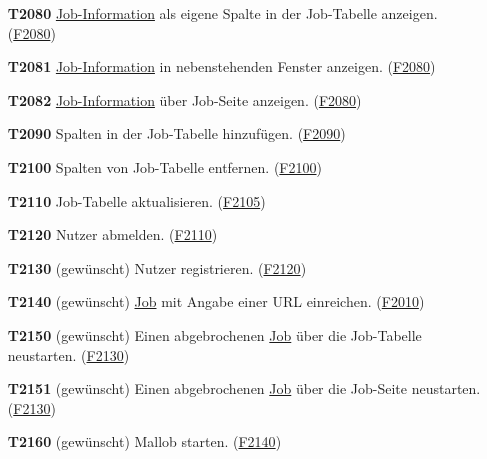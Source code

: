 \begin{itemize}
    \item[\textbf{T2080}] \hyperref[B:Job-Informationen]{Job-Information} als eigene Spalte in der Job-Tabelle anzeigen. (\hyperref[FA:Web-Interface:Einsehen von Job-Informationen]{F2080})
    
    \item[\textbf{T2081}] \hyperref[B:Job-Informationen]{Job-Information} in nebenstehenden Fenster anzeigen. (\hyperref[FA:Web-Interface:Einsehen von Job-Informationen]{F2080})
    
    \item[\textbf{T2082}] \hyperref[B:Job-Informationen]{Job-Information} über Job-Seite anzeigen. (\hyperref[FA:Web-Interface:Einsehen von Job-Informationen]{F2080})
    
    \item[\textbf{T2090}] Spalten in der Job-Tabelle hinzufügen. (\hyperref[FA:Web-Interface:Hinzufügen von Spalten]{F2090})
    
    \item[\textbf{T2100}] Spalten von Job-Tabelle entfernen. (\hyperref[FA:Web-Interface:Entfernen von Spalten]{F2100}) 
    
    \item[\textbf{T2110}] Job-Tabelle aktualisieren. (\hyperref[FA:Web-Interface:Aktualisieren]{F2105})
    
    \item[\textbf{T2120}] \gls{Nutzer} abmelden. (\hyperref[FA:Web-Interface:Abmelden]{F2110})
    
    \item[\textbf{T2130}] (gewünscht) \gls{Nutzer} registrieren. (\hyperref[FA:Web-Interface:Registrierung von Nutzern]{F2120})
    
    \item[\textbf{T2140}] (gewünscht) \hyperref[B:Jobs]{Job} mit Angabe einer \gls{URL} einreichen. (\hyperref[FA:Web-Interface:Job einreichen]{F2010})
    
    \item[\textbf{T2150}] (gewünscht) Einen abgebrochenen \hyperref[B:Jobs]{Job} über die Job-Tabelle neustarten. (\hyperref[FA:Web-Interface:Neustart]{F2130})
    
    \item[\textbf{T2151}] (gewünscht) Einen abgebrochenen \hyperref[B:Jobs]{Job} über die Job-Seite neustarten. (\hyperref[FA:Web-Interface:Neustart]{F2130})
    
    \item[\textbf{T2160}] (gewünscht) \gls{Mallob} starten. (\hyperref[FA:Web-Interface:Verwalten von Malllob]{F2140})
    

\end{itemize}
